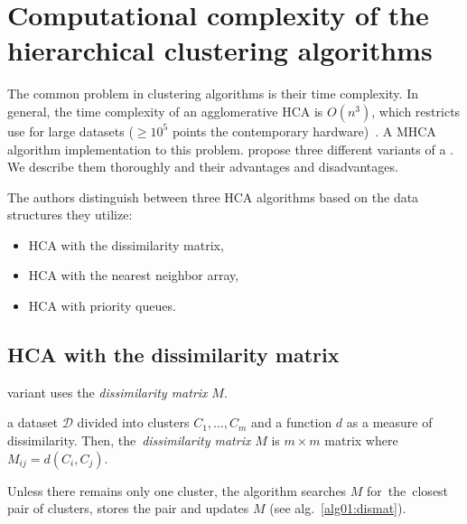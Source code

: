\section{Computational complexity of the hierarchical clustering algorithms}

The common problem in clustering algorithms is their time complexity. In general, the time complexity of an agglomerative HCA is $O(n^3)$, which restricts  use for large datasets ($\geq10^5$ points  the contemporary hardware)~\cite{sasirekha2013agglomerative}.
A MHCA algorithm implementation  to this problem. \citet{day1984efficient} propose three different variants of a . We describe them thoroughly and  their advantages and disadvantages.

The authors distinguish between three HCA algorithms based on the data structures they utilize:
\begin{itemize}
	\item HCA with the dissimilarity matrix,
	\item HCA with the nearest neighbor array,
	\item HCA with priority queues.
\end{itemize}

\subsection{HCA with the dissimilarity matrix}

 variant uses the \emph{dissimilarity matrix} $M$.

\begin{defn}
	 a dataset $\mathcal{D}$ divided into clusters $C_1,\dots,C_m$ and a function $d$ as a measure of dissimilarity. Then, the~\emph{dissimilarity matrix} $M$ is $m\times m$ matrix where $M_{ij} = d(C_i,C_j)$.
	\label{def01:dismat}
\end{defn}

Unless there remains only one cluster, the  algorithm searches $M$ for~the~closest pair of clusters, stores the pair and updates $M$ (see alg.~\ref{alg01:dismat}).

